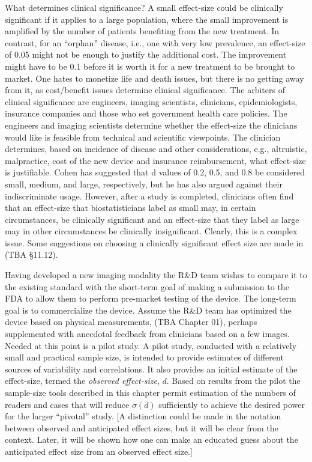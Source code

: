 \documentclass[
]{book}
\begin{document}
What determines clinical significance? A small effect-size could be clinically significant if it applies to a large population, where the small improvement is amplified by the number of patients benefiting from the new treatment. In contrast, for an ``orphan'' disease, i.e., one with very low prevalence, an effect-size of 0.05 might not be enough to justify the additional cost. The improvement might have to be 0.1 before it is worth it for a new treatment to be brought to market. One hates to monetize life and death issues, but there is no getting away from it, as cost/benefit issues determine clinical significance. The arbiters of clinical significance are engineers, imaging scientists, clinicians, epidemiologists, insurance companies and those who set government health care policies. The engineers and imaging scientists determine whether the effect-size the clinicians would like is feasible from technical and scientific viewpoints. The clinician determines, based on incidence of disease and other considerations, e.g., altruistic, malpractice, cost of the new device and insurance reimbursement, what effect-size is justifiable. Cohen has suggested that d values of 0.2, 0.5, and 0.8 be considered small, medium, and large, respectively, but he has also argued against their indiscriminate usage. However, after a study is completed, clinicians often find that an effect-size that biostatisticians label as small may, in certain circumstances, be clinically significant and an effect-size that they label as large may in other circumstances be clinically insignificant. Clearly, this is a complex issue. Some suggestions on choosing a clinically significant effect size are made in (TBA §11.12).

Having developed a new imaging modality the R\&D team wishes to compare it to the existing standard with the short-term goal of making a submission to the FDA to allow them to perform pre-market testing of the device. The long-term goal is to commercialize the device. Assume the R\&D team has optimized the device based on physical measurements, (TBA Chapter 01), perhaps supplemented with anecdotal feedback from clinicians based on a few images. Needed at this point is a pilot study. A pilot study, conducted with a relatively small and practical sample size, is intended to provide estimates of different sources of variability and correlations. It also provides an initial estimate of the effect-size, termed the \emph{observed effect-size}, \(d\). Based on results from the pilot the sample-size tools described in this chapter permit estimation of the numbers of readers and cases that will reduce \(\sigma(d)\) sufficiently to achieve the desired power for the larger ``pivotal'' study. {[}A distinction could be made in the notation between observed and anticipated effect sizes, but it will be clear from the context. Later, it will be shown how one can make an educated guess about the anticipated effect size from an observed effect size.{]}
\end{document}
